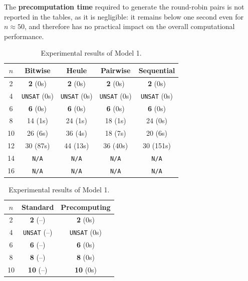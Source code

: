 The \textbf{precomputation time} required to generate the round-robin pairs is not reported in the tables, as it is negligible: it remains below one second even for 
$n\approx50$, and therefore has no practical impact on the overall computational performance.

\begin{table}[h]
\centering
\scriptsize

\begin{minipage}[t]{0.55\textwidth}
\centering
\setlength{\tabcolsep}{3pt}
\renewcommand{\arraystretch}{1.05}
\begin{tabular}{c|c|c|c|c}
\hline
$n$ & Bitwise & Heule & Pairwise & Sequential \\
\hline
2   & \textbf{2} (0s)  & \textbf{2} (0s)  & \textbf{2} (0s)  & \textbf{2} (0s) \\
4   & \texttt{UNSAT} (0s) & \texttt{UNSAT} (0s) & \texttt{UNSAT} (0s) & \texttt{UNSAT} (0s) \\
6   & \textbf{6} (0s)  & \textbf{6} (0s)  & \textbf{6} (0s)  & \textbf{6} (0s) \\
8   & 14 (1s)          & 24 (1s)          & 18 (1s)          & 24 (0s) \\
10  & 26 (6s)          & 36 (4s)          & 18 (7s)          & 20 (6s) \\
12  & 30 (87s)         & 44 (13s)         & 36 (40s)         & 30 (151s) \\
14  & \texttt{N/A}     & \texttt{N/A}     & \texttt{N/A}     & \texttt{N/A} \\
16  & \texttt{N/A}     & \texttt{N/A}     & \texttt{N/A}     & \texttt{N/A} \\
\hline
\end{tabular}
\caption{Experimental results of Model 1.}
\label{tab:results_sat_m1}
\end{minipage}
\hfill
\begin{minipage}[t]{0.42\textwidth}
\centering
\setlength{\tabcolsep}{3pt}
\renewcommand{\arraystretch}{1.05}
\begin{tabular}{c|c|c}
\hline
$n$ & Standard & Precomputing \\
\hline
2   & \textbf{2} (--)      & \textbf{2} (0s) \\
4   & \texttt{UNSAT} (--)  & \texttt{UNSAT} (0s) \\
6   & \textbf{6} (--)      & \textbf{6} (0s) \\
8   & \textbf{8} (--)      & \textbf{8} (0s) \\
10  & \textbf{10} (--)     & \textbf{10} (0s) \\

\end{tabular}
\end{minipage}
\end{table}
